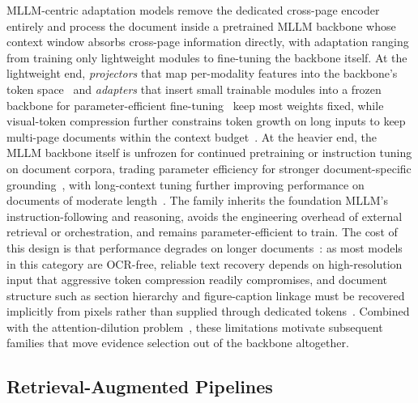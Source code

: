 MLLM-centric adaptation models remove the dedicated cross-page encoder entirely and process the document inside a pretrained MLLM backbone whose context window absorbs cross-page information directly, with adaptation ranging from training only lightweight modules to fine-tuning the backbone itself. At the lightweight end, \emph{projectors} that map per-modality features into the backbone's token space~\cite{tanaka2024instructdoc} and \emph{adapters} that insert small trainable modules into a frozen backbone for parameter-efficient fine-tuning~\cite{zhu2025simple} keep most weights fixed, while visual-token compression further constrains token growth on long inputs to keep multi-page documents within the context budget~\cite{hu2025mplug}. At the heavier end, the MLLM backbone itself is unfrozen for continued pretraining or instruction tuning on document corpora, trading parameter efficiency for stronger document-specific grounding~\cite{duan2025docopilot}, with long-context tuning further improving performance on documents of moderate length~\cite{hu2024mplug, yu2024texthawk2}. The family inherits the foundation MLLM's instruction-following and reasoning, avoids the engineering overhead of external retrieval or orchestration, and remains parameter-efficient to train. The cost of this design is that performance degrades on longer documents~\cite{jia2025leopard}: as most models in this category are OCR-free, reliable text recovery depends on high-resolution input that aggressive token compression readily compromises, and document structure such as section hierarchy and figure-caption linkage must be recovered implicitly from pixels rather than supplied through dedicated tokens~\cite{hannan2026docslm, duan2025docopilot}. Combined with the attention-dilution problem~\cite{liu2024lost}, these limitations motivate subsequent families that move evidence selection out of the backbone altogether.

\subsection{Retrieval-Augmented Pipelines} 
\label{sec:arch-ra}

